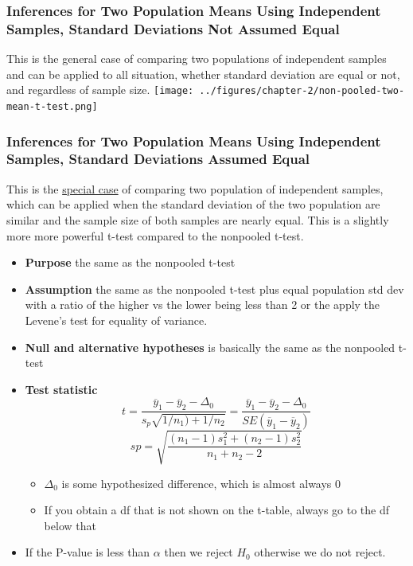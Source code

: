 \documentclass[../STAT-252-Notes.tex]{subfiles}
\begin{document}
\subsubsection{ Inferences for Two Population Means Using Independent Samples, Standard Deviations
Not Assumed Equal}
This is the general case of comparing two populations of independent samples and can be applied to all situation, whether standard deviation are equal or not, and regardless of sample size.
{\centering\texttt{[image: ../figures/chapter-2/non-pooled-two-mean-t-test.png]}~\\}
\subsubsection{Inferences for Two Population Means Using Independent Samples, Standard Deviations
Assumed Equal}
This is the \underline{special case} of comparing two population of independent samples, which can be applied when the standard deviation of the two population are similar and the sample size of both samples are nearly equal.
This is a slightly more more powerful t-test compared to the nonpooled t-test.
\begin{itemize}
  \item \textbf{Purpose} the same as the nonpooled t-test
    \item \textbf{Assumption} the same as the nonpooled t-test plus equal population std dev with a ratio of the higher vs the lower being less than 2 or the apply the Levene's test for equality of variance.
    \item \textbf{Null and alternative hypotheses} is basically the same as the nonpooled t-test
      \item \textbf{Test statistic} 
        \[ 
          t = \frac{\overline{y}_1 - \overline{y}_2 - \Delta_0}{s_p \sqrt{1 / n_1) + 1 / n_2} } =  \frac{\overline{y}_1 - \overline{y}_2 - \Delta_0}{SE(\overline{y}_1 - \overline{y}_2)} 
        \] 
       \[ 
         sp = \sqrt{\frac{(n_1 - 1) s^2_1 + (n_2 - 1) s^2_2 }{n_1+n_2-2}}  
       \] 
       \begin{Note}
         \begin{itemize}
           \item $\Delta_0$ is some hypothesized difference, which is almost always 0
            \item If you obtain a df that is not shown on the t-table, always go to the df below that
         \end{itemize}
       \end{Note} 
       \item If the P-value is less than $\alpha$ then we reject $H_0$ otherwise we do not reject.

\end{itemize}
\end{document}
